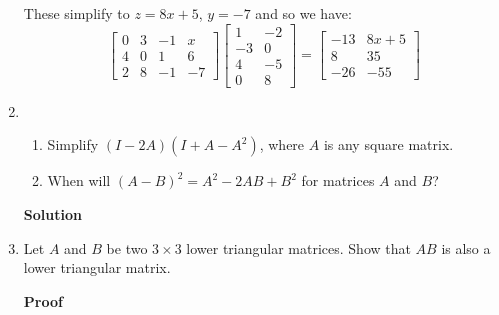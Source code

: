 \begin{enumerate}
\noindent These simplify to $z=8x+5$, $y=-7$ and so we have:
$$\left [ \begin{array}{rrrr}
0&3&-1&x\\ 4&0&1&6 \\ 2&8&-1&-7 \end{array} \right ] \left [
\begin{array}{rr} 1&-2\\-3&0\\4&-5\\0&8 \end{array} \right ]=\left [
\begin{array}{rr} -13&8x+5\\8&35~~\\-26&-55~~ \end{array} \right ]$$

\item \begin{enumerate}
\item Simplify $(I-2A)(I+A-A^2)$, where $A$ is any square matrix.
\item When will $(A-B)^2=A^2-2AB+B^2$ for matrices $A$ and $B$?
\end{enumerate}

\noindent \textbf{Solution}

\item Let $A$ and $B$ be two $3 \times 3$ lower triangular
matrices. Show that $AB$ is also a lower triangular matrix.



\noindent \textbf{Proof}


\end{enumerate}
